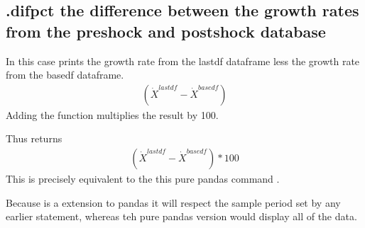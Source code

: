 \documentclass[letterpaper,10pt,english]{jupyterBook}
\begin{document}
\subsection{.difpct the difference between the growth rates from the pre\sphinxhyphen{}shock and post\sphinxhyphen{}shock database}
\label{\detokenize{content/05_SimpleModel/SimpleModel:difpct-the-difference-between-the-growth-rates-from-the-pre-shock-and-post-shock-database}}
\sphinxAtStartPar
In this case  prints the growth rate from the lastdf dataframe less the growth rate from the basedf dataframe.
\begin{equation*}
\begin{split}(\dot{X}^{lastdf}-\dot{X}^{basedf})\end{split}
\end{equation*}
\sphinxAtStartPar
Adding the function  multiplies the result by 100.

\sphinxAtStartPar
Thus  returns
\begin{equation*}
\begin{split}(\dot{X}^{lastdf}-\dot{X}^{basedf})*100\end{split}
\end{equation*}
\sphinxAtStartPar
This is precisely equivalent to the this pure pandas command .

\sphinxAtStartPar
Because  is a  extension to pandas it will respect the sample period set by any earlier  statement, whereas teh pure pandas version would display all of the data.
\end{document}
